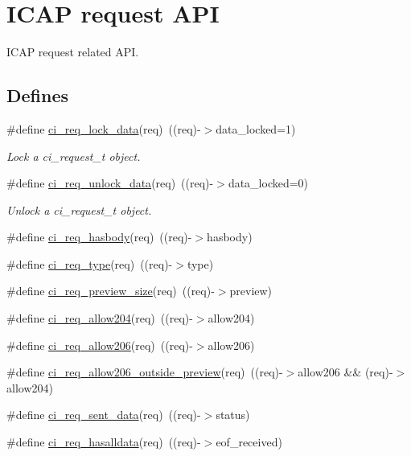 \hypertarget{group__REQUEST}{
\section{ICAP request API}
\label{group__REQUEST}
}


ICAP request related API.  
\subsection*{Defines}
\begin{DoxyCompactItemize}
\item 
\#define \hyperlink{group__REQUEST_gaf08ade43e662a7290d87fe0111996bcf}{ci\_\-req\_\-lock\_\-data}(req)~((req)-\/$>$data\_\-locked=1)
\begin{DoxyCompactList}\small\item\em Lock a ci\_\-request\_\-t object. \item\end{DoxyCompactList}\item 
\#define \hyperlink{group__REQUEST_ga7d6685cf10deb060690da7f17020634e}{ci\_\-req\_\-unlock\_\-data}(req)~((req)-\/$>$data\_\-locked=0)
\begin{DoxyCompactList}\small\item\em Unlock a ci\_\-request\_\-t object. \item\end{DoxyCompactList}\item 
\#define \hyperlink{group__REQUEST_ga880e2efbfecb44754d9eca657a2fc63c}{ci\_\-req\_\-hasbody}(req)~((req)-\/$>$hasbody)
\item 
\#define \hyperlink{group__REQUEST_ga513b0e67c47d0a33b9d0e48080c796b2}{ci\_\-req\_\-type}(req)~((req)-\/$>$type)
\item 
\#define \hyperlink{group__REQUEST_ga232d8f27e899f6ca044c48808c6de5f0}{ci\_\-req\_\-preview\_\-size}(req)~((req)-\/$>$preview)
\item 
\#define \hyperlink{group__REQUEST_gafbf6996e069feff290985ed0c6d9da41}{ci\_\-req\_\-allow204}(req)~((req)-\/$>$allow204)
\item 
\#define \hyperlink{group__REQUEST_ga96465be5046df471fc12aead53450577}{ci\_\-req\_\-allow206}(req)~((req)-\/$>$allow206)
\item 
\#define \hyperlink{group__REQUEST_ga275b5e800b461574d3da66b22fbd0a29}{ci\_\-req\_\-allow206\_\-outside\_\-preview}(req)~((req)-\/$>$allow206 \&\& (req)-\/$>$allow204)
\item 
\#define \hyperlink{group__REQUEST_ga63d1227f02799e998ef8aa4a6066f791}{ci\_\-req\_\-sent\_\-data}(req)~((req)-\/$>$status)
\item 
\#define \hyperlink{group__REQUEST_ga0b1cadb60f6d198af3a04cc13442c3cb}{ci\_\-req\_\-hasalldata}(req)~((req)-\/$>$eof\_\-received)
\end{DoxyCompactItemize}
